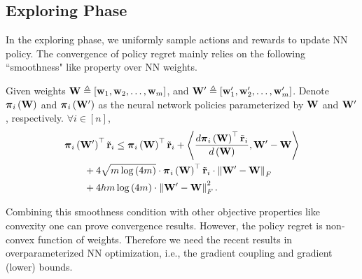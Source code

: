 \subsection{Exploring Phase}
\label{subsec:exploring_phase}

In the exploring phase, we uniformly sample actions and rewards to update NN policy. The convergence of policy regret mainly relies on the following ``smoothness" like property over NN weights.

\begin{lem}
\label{lem:smoothness}
    Given weights ${\mathbf{W}} \triangleq \left[ {\mathbf{w}}_1, {\mathbf{w}}_2, \dots, {\mathbf{w}}_m \right]$, and ${\mathbf{W}}^\prime \triangleq \left[ {\mathbf{w}}_1^\prime, {\mathbf{w}}_2^\prime, \dots, {\mathbf{w}}_m^\prime \right]$. Denote ${\boldsymbol{\pi}}_i\left( {\mathbf{W}} \right)$ and ${\boldsymbol{\pi}}_i\left( {\mathbf{W}}^\prime \right)$ as the neural network policies parameterized by ${\mathbf{W}}$ and ${\mathbf{W}}^\prime$, respectively. $\forall i \in [n]$,
\begin{equation*}
\begin{split}
    &{\boldsymbol{\pi}}_i\left( {\mathbf{W}}^\prime \right)^\top {\tilde{\mathbf{r}}}_i \le {\boldsymbol{\pi}}_i\left( {\mathbf{W}} \right)^\top {\tilde{\mathbf{r}}}_i + \left\langle \frac{d {\boldsymbol{\pi}}_i\left( {\mathbf{W}} \right)^\top {\tilde{\mathbf{r}}}_i }{d\left( {\mathbf{W}} \right)}, {\mathbf{W}}^\prime - {\mathbf{W}} \right\rangle \\
    &\qquad + 4 \sqrt{m \log{\left(4m\right)}} \cdot {\boldsymbol{\pi}}_i\left( {\mathbf{W}} \right)^\top {\tilde{\mathbf{r}}}_i \cdot \left\| {\mathbf{W}}^\prime - {\mathbf{W}} \right\|_F \\
    &\qquad + 4 h m \log{\left(4m\right)} \cdot \left\| {\mathbf{W}}^\prime - {\mathbf{W}} \right\|_F^2.
\end{split}
\end{equation*}
\end{lem}

Combining this smoothness condition with other objective properties like convexity one can prove convergence results. However, the policy regret is non-convex function of weights. Therefore we need the recent results in overparameterized NN optimization, i.e., the gradient coupling and gradient (lower) bounds.

